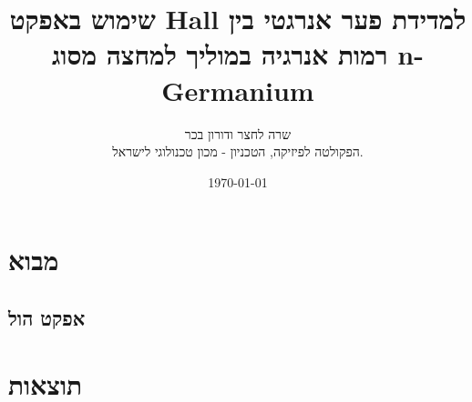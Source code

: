 \documentclass{article}
\title{
שימוש באפקט
\textenglish{Hall}
למדידת פער אנרגטי בין רמות אנרגיה במוליך למחצה מסוג
\textenglish{n-Germanium}
}
\author{
שרה לחצר ודורון בכר \\
הפקולטה לפיזיקה, הטכניון - מכון טכנולוגי לישראל.
}
\date{\today}
\begin{document}
\maketitle

\begin{abstract}
\end{abstract}
\section{מבוא}
\subsection{אפקט הול}

\section{תוצאות}
\end{document}
